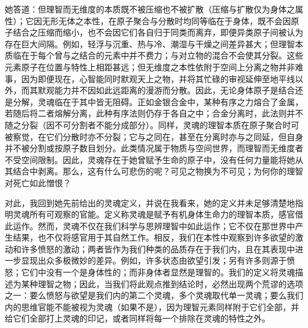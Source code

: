 她答道：但理智而无维度的本质既不被压缩也不被扩散（压缩与扩散仅为身体之属性）；它因无形无体之本性，在原子聚合与分散时均同等临在于身体，既不会因原子结合之压缩而缩小，也不会因它们各自归于同类而离弃，即便异类原子间被认为存在巨大间隔。例如，轻浮与沉重、热与冷、潮湿与干燥之间差异甚大；但理智本质临在于每个曾与之结合的元素中并不费力；与对立物的混合不会使其分裂。这些元素原子在位置与特性上相距甚远；但无维度之本性依附于空间上分离之物并非难事，因为即便现在，心智能同时默观天上之物，并将其忙碌的审视延伸至地平线以外，而其默观能力并不因如此远距离的漫游而分散。因此，无论身体原子是结合还是分解，灵魂临在于其中皆无阻碍。正如金银合金中，某种有序之力熔合了金属，若随后将二者熔解分离，此种有序法则仍存于各自之中；合金分离时，此法则并不随之分裂（因不可分割者不能分成部分）。同样，灵魂的理智本质在原子聚合时可被察觉，在它们分散时亦不分裂；它与之同在，甚至在分离时亦与之同延，但自身并不被分割或按原子数目划分。此类情况属于物质与空间世界，而理智而无维度者不受空间限制。因此，灵魂存在于她曾赋予生命的原子中，没有任何力量能将她从其结合中剥离。那么，这有什么可悲伤的呢？可见之物换为不可见；为何你的理智对死亡如此憎恨？\par

对此，我回到她先前给出的灵魂定义，并说在我看来，她的定义并未足够清楚地指明灵魂所有可观察的官能。定义称灵魂是赋予有机身体生命力的理智本质，感官借此运作。然而，灵魂不仅在我们科学与思辨理智中如此运作；它不仅在那世界中产生结果，也不仅将感官用于其自然工作。相反，我们在本性中观察到许多欲望的激动和许多愤怒的激动；两者皆作为我们种类的品质存在于我们内，且在其表现中进一步显现出众多极微妙的差异。例如，许多状态由欲望引发；另有许多则源于愤怒；它们中没有一个是身体性的；而非身体者显然是理智的。我们的定义将灵魂描述为某种理智之物；因此，当我们将此观点推到结论时，必然出现两个荒谬的选项之一：要么愤怒与欲望是我们内的第二个灵魂，多个灵魂取代单一灵魂；要么我们内的思维官能不能被视为灵魂（如果不是），因为理智元素同样附于它们全部，并给它们全部打上灵魂的印记，或者同样将每一个排除在灵魂的特性之外。\par

